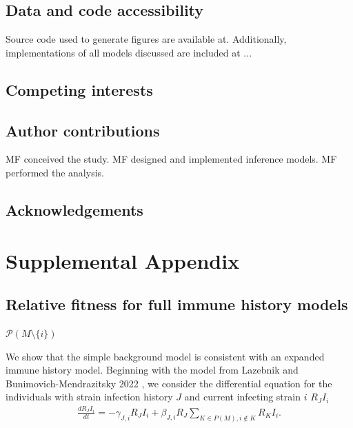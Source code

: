 \documentclass[12pt,oneside,letterpaper]{article}
\begin{document}
\subsection*{Data and code accessibility}

Source code used to generate figures are available at. 
Additionally, implementations of all models discussed are included at ...

\subsection*{Competing interests}%

\subsection*{Author contributions}
MF conceived the study. 
MF designed and implemented inference models. 
MF performed the analysis. 


\subsection*{Acknowledgements}%




\newpage

\appendix

\setcounter{figure}{0}
\setcounter{table}{0}
\setcounter{page}{1}
\renewcommand{\thefigure}{S\arabic{figure}}
\renewcommand{\thetable}{S\arabic{table}}
\renewcommand{\thepage}{S\arabic{page}}

\section*{Supplemental Appendix}

\subsection*{Relative fitness for full immune history models}%

$\mathcal{P}(M \setminus \{i\})$

We show that the simple background model is consistent with an expanded immune history model. 
Beginning with the model from Lazebnik and Bunimovich-Mendrazitsky 2022 \cite{Lazebnik2022}, we consider the differential equation for the individuals with strain infection history $J$ and current infecting strain $i$ $R_{J}I_{i}$
\begin{align*}
\frac{dR_{J} I_{i}}{dt} = - \gamma_{J, i} R_{J} I_{i} + \beta_{J, i} R_{J} \sum_{K \in P(M), i\notin K} R_{K}I_{i}.
\end{align*}
\end{document}
